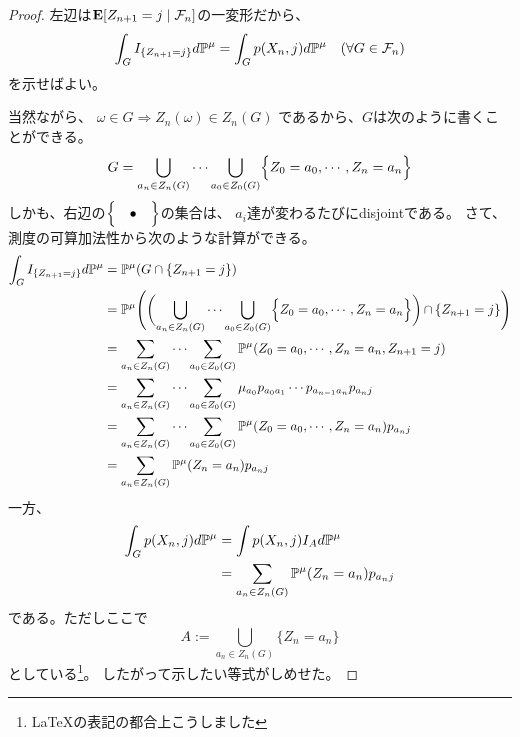         \begin{proof}
           左辺は${\mathbf{E}}[Z_{n+1} = j \mid \mathcal{F}_n]$の一変形だから、
           \[
              \int_G I_{\{Z_{n+1} = j\}} d{\mathbb{P}}^{\mu} = \int_G p(X_n ,j) d{\mathbb{P}}^{\mu} \quad (\forall G \in \mathcal{F}_n)
           \]
           を示せばよい。

           当然ながら、
           $\omega \in G \Rightarrow Z_n(\omega) \in Z_n(G)$
           であるから、$G$は次のように書くことができる。
           \[
            G = \bigcup_{a_n \in Z_n(G)} \cdots \bigcup_{a_0 \in Z_0(G)} \Bigl\{ Z_0 = a_0, \cdots ,Z_n = a_n \Bigr\}
           \]
           しかも、右辺の$\Bigl\{ \quad \bullet \quad \Bigr\}$の集合は、
           $a_i$達が変わるたびにdisjointである。
           さて、測度の可算加法性から次のような計算ができる。
           \begin{align*}
             \int_G I_{\{Z_{n+1} = j\}} d{\mathbb{P}}^{\mu}
             &= {\mathbb{P}}^{\mu}(G \cap \{Z_{n+1} = j\}) \\
             &={\mathbb{P}}^{\mu} \Biggl( \biggl( \bigcup_{a_n \in Z_n(G)} \cdots \bigcup_{a_0 \in Z_0(G)} \Bigl\{ Z_0 = a_0, \cdots ,Z_n = a_n \Bigr\} \biggl) \, \cap \, \{Z_{n+1} = j \} \Biggr) \\
             &= \sum_{a_n \in Z_n(G)} \cdots \sum_{a_0 \in Z_0(G)} {\mathbb{P}}^{\mu}(Z_0 = a_0, \cdots , Z_n = a_n, Z_{n+1}=j) \\
             &= \sum_{a_n \in Z_n(G)} \cdots \sum_{a_0 \in Z_0(G)}\mu_{a_0}p_{a_0 a_1}\cdots p_{a_{n-1}a_n}p_{a_{n}j}\\
             &= \sum_{a_n \in Z_n(G)} \cdots \sum_{a_0 \in Z_0(G)}{\mathbb{P}}^{\mu}(Z_0 = a_0, \cdots ,Z_n = a_n)p_{a_{n}j}\\
             &= \sum_{a_n \in Z_n(G)}{\mathbb{P}}^{\mu}(Z_n = a_n)p_{a_{n}j}
           \end{align*}
           一方、
           \begin{align*}
             \int_G p(X_n ,j) d{\mathbb{P}}^{\mu}
             &= \int p(X_n ,j) I_{A} d{\mathbb{P}}^{\mu} \\
             &=\sum_{a_n \in Z_n(G)}{\mathbb{P}}^{\mu}(Z_n = a_n)p_{a_{n}j}
           \end{align*}
           である。ただしここで
           \[
              A := \bigcup_{a_n \in Z_n(G)}\{Z_n = a_n\}
           \]
           としている\footnote{\LaTeX の表記の都合上こうしました}。
           したがって示したい等式がしめせた。
        \end{proof}


